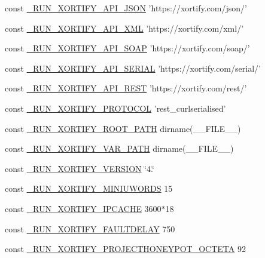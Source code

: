 \begin{DoxyCompactItemize}
const \hyperlink{config_8php_ae0b83927b3de7c940a5ecc3394c477c1}{\-\_\-\-R\-U\-N\-\_\-\-X\-O\-R\-T\-I\-F\-Y\-\_\-\-A\-P\-I\-\_\-\-J\-S\-O\-N} 'https\-://xortify.\-com/json/'
\item 
const \hyperlink{config_8php_a06d90470f73c5733025a42529edeed81}{\-\_\-\-R\-U\-N\-\_\-\-X\-O\-R\-T\-I\-F\-Y\-\_\-\-A\-P\-I\-\_\-\-X\-M\-L} 'https\-://xortify.\-com/xml/'
\item 
const \hyperlink{config_8php_ae70cb7261883567bb22daf20a4622db2}{\-\_\-\-R\-U\-N\-\_\-\-X\-O\-R\-T\-I\-F\-Y\-\_\-\-A\-P\-I\-\_\-\-S\-O\-A\-P} 'https\-://xortify.\-com/soap/'
\item 
const \hyperlink{config_8php_aea9a9c3a6d8b4e34ce4cf721d92c71b0}{\-\_\-\-R\-U\-N\-\_\-\-X\-O\-R\-T\-I\-F\-Y\-\_\-\-A\-P\-I\-\_\-\-S\-E\-R\-I\-A\-L} 'https\-://xortify.\-com/serial/'
\item 
const \hyperlink{config_8php_ab6571471cd133242a01d01cc3c8e7815}{\-\_\-\-R\-U\-N\-\_\-\-X\-O\-R\-T\-I\-F\-Y\-\_\-\-A\-P\-I\-\_\-\-R\-E\-S\-T} 'https\-://xortify.\-com/rest/'
\item 
const \hyperlink{config_8php_aa8f158f551730a054a3adbdf9562e514}{\-\_\-\-R\-U\-N\-\_\-\-X\-O\-R\-T\-I\-F\-Y\-\_\-\-P\-R\-O\-T\-O\-C\-O\-L} 'rest\-\_\-curlserialised'
\item 
const \hyperlink{config_8php_ac6fe97d5bed058caeb41a99e3672e9df}{\-\_\-\-R\-U\-N\-\_\-\-X\-O\-R\-T\-I\-F\-Y\-\_\-\-R\-O\-O\-T\-\_\-\-P\-A\-T\-H} dirname(\-\_\-\-\_\-\-F\-I\-L\-E\-\_\-\-\_\-)
\item 
const \hyperlink{config_8php_ae62d588ab1fe5f46957b6cb8b9f688b8}{\-\_\-\-R\-U\-N\-\_\-\-X\-O\-R\-T\-I\-F\-Y\-\_\-\-V\-A\-R\-\_\-\-P\-A\-T\-H} dirname(\-\_\-\-\_\-\-F\-I\-L\-E\-\_\-\-\_\-)
\item 
const \hyperlink{config_8php_a585048c5865b9a94a4d694b669bbeb3b}{\-\_\-\-R\-U\-N\-\_\-\-X\-O\-R\-T\-I\-F\-Y\-\_\-\-V\-E\-R\-S\-I\-O\-N} \char`\"{}4.\char`\"{}
\item 
const \hyperlink{config_8php_ab7a11b6811298275ddfe71991f994b00}{\-\_\-\-R\-U\-N\-\_\-\-X\-O\-R\-T\-I\-F\-Y\-\_\-\-M\-I\-N\-I\-U\-W\-O\-R\-D\-S} 15
\item 
const \hyperlink{config_8php_a3f7e0e8a1c859e63c0a61567592da649}{\-\_\-\-R\-U\-N\-\_\-\-X\-O\-R\-T\-I\-F\-Y\-\_\-\-I\-P\-C\-A\-C\-H\-E} 3600$\ast$18
\item 
const \hyperlink{config_8php_aa3f30835bc0c273f6e70c1c13c9b6eaf}{\-\_\-\-R\-U\-N\-\_\-\-X\-O\-R\-T\-I\-F\-Y\-\_\-\-F\-A\-U\-L\-T\-D\-E\-L\-A\-Y} 750
\item 
const \hyperlink{config_8php_a929998d578c00fffc6d6e71f3f857897}{\-\_\-\-R\-U\-N\-\_\-\-X\-O\-R\-T\-I\-F\-Y\-\_\-\-P\-R\-O\-J\-E\-C\-T\-H\-O\-N\-E\-Y\-P\-O\-T\-\_\-\-O\-C\-T\-E\-T\-A} 92

\end{DoxyCompactItemize}
